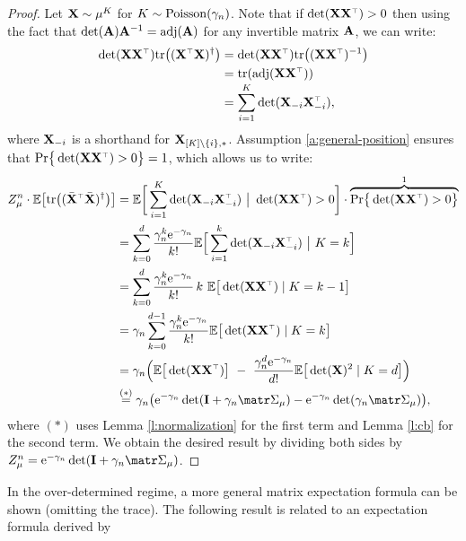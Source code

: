 \documentclass[../../thesis.tex]{subfiles}
\begin{document}
\begin{proof}
  Let $\mathbf X\sim\mu^K$ for $K\sim{\operatorname{Poisson}}({\gamma_n})$. Note that if
  $\det(\X\X^\top)>0$ then using the fact that
  $\det(\mathbf A)\mathbf A^{-1}=\operatorname{\textnormal{adj}}(\mathbf A)$ for any invertible matrix $\mathbf A$, we can write:
  \begin{align*}
    \det(\X\X^\top)\tr\big((\X^\top\X)^{\dagger}\big)
     & = \det(\X\X^\top)\tr\big((\X\X^\top)^{-1}\big) \\
     & = \tr(\adj(\X\X^\top))                         \\[-1mm]
     & = \sum_{i=1}^K\det(\X_{-i}\X_{-i}^\top),
  \end{align*}
  where $\mathbf X_{-i}$ is a shorthand for $\mathbf X_{[K]\backslash\{i\},*}$.
  Assumption \ref{a:general-position} ensures that
  $\Pr\big\{\det(\X\X^\top)>0\big\}=1$, which allows us to write:
  \begin{align*}
    Z_\mu^n\cdot \E\big[\tr\big((\Xb^\top\Xb)^{\dagger}\big)\big]
     & =\E\bigg[
      \sum_{i=1}^K\det(\X_{-i}\X_{-i}^\top)\ \big|\
    \det(\X\X^\top)>0\bigg]\cdot\overbrace{\Pr\big\{\det(\X\X^\top)>0\big\}}^{1}   \\
     & =\sum_{k=0}^d\frac{\gamma_n^{k}\ee^{-\gamma_n}}{k!}\E\Big[
    \sum_{i=1}^k\det(\X_{-i}\X_{-i}^\top)\ \big|\  K=k\Big]                        \\
     & =\sum_{k=0}^d\frac{\gamma_n^{k}\ee^{-\gamma_n}}{k!}\, k\
    \E\big[\det(\X\X^\top)\mid K=k-1\big]                                          \\
     & =\gamma_n\sum_{k=0}^{d-1}\frac{\gamma_n^{k}\ee^{-\gamma_n}}{k!}
    \E\big[\det(\X\X^\top)\mid K=k\big]                                            \\
     & =\gamma_n\Big(\E\big[\det(\X\X^\top)\big]\ -\
    \frac{\gamma_n^{d}\ee^{-\gamma_n}}{d!}\E\big[\det(\X)^2\mid K=d\big]
    \Big)                                                                          \\
     & \overset{(*)}{=}\gamma_n\big(\ee^{-\gamma_n}\det(\I +\gamma_n\Sigmab_\mu) -
    \ee^{-\gamma_n}\det(\gamma_n\Sigmab_\mu)\big),
  \end{align*}
  where $(*)$ uses Lemma \ref{l:normalization} for the first term and
  Lemma \ref{l:cb} for the second term. We obtain the desired result by
  dividing both sides by
  $Z_\mu^n=\ee^{-\gamma_n}\det(\I+\gamma_n\Sigmab_\mu)$.
\end{proof}
In the over-determined regime, a more general matrix expectation
formula can be shown (omitting the trace). The following result is
related to an expectation formula derived by
\end{document}
